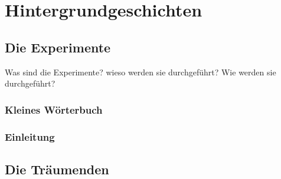 \documentclass[12pt, a4paper, openany]{report}
\begin{document}
\section{Hintergrundgeschichten}

\subsection{Die Experimente}
Was sind die Experimente? wieso werden sie durchgeführt? Wie werden sie durchgeführt?
\subsubsection{Kleines Wörterbuch}
\subsubsection{Einleitung}

\subsection{Die Träumenden} 
\end{document}
